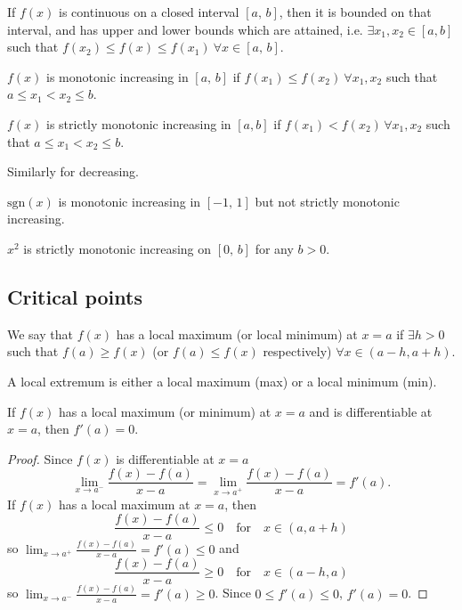 \documentclass[10pt, a4paper]{article}
\begin{document}
\begin{theorem}\label{calc_thm_extvalthm}
    If $f(x)$ is continuous on a closed interval $[a,\,b]$,
    then it is bounded on that interval,
    and has upper and lower bounds which are attained,
    i.e. $\exists x_1, x_2 \in [a, b]$ such that $f(x_2) \leq f(x) \leq f(x_1)\ \forall x \in [a,\,b]$.
\end{theorem}

\begin{definition}
    $f(x)$ is monotonic increasing in $[a,\,b]$ if
    $f(x_1) \leq f(x_2)\ \forall x_1, x_2$ such that
    $a \leq x_1 < x_2 \leq b$.
\end{definition}

\begin{definition}
    $f(x)$ is strictly monotonic increasing in $[a, b]$
    if $f(x_1) < f(x_2)\, \forall x_1, x_2$ such that
    $a \leq x_1 < x_2 \leq b$.
\end{definition}

Similarly for decreasing.

\begin{example}
    $\mathrm{sgn}(x)$ is monotonic increasing in $[-1,\,1]$
    but not strictly monotonic increasing.
\end{example}

\begin{example}
    $x ^ 2$ is strictly monotonic increasing on $[0,\,b]$ for any $b > 0$.
\end{example}

\subsection{Critical points}

\begin{definition}
    We say that $f(x)$ has a local maximum (or local minimum) at $x = a$ if $\exists h > 0$ such that $f(a) \geq f(x)$ (or $f(a) \leq f(x)$ respectively) $\forall x \in (a - h, a + h)$.
\end{definition}

A local extremum is either a local maximum (max) or a local minimum (min).

If $f(x)$ has a local maximum (or minimum) at $x = a$ and is differentiable at $x = a$,
then $f'(a) = 0$.
\begin{proof}
    Since $f(x)$ is differentiable at $x = a$
    \[
    \lim_{x \rightarrow a ^ {-}}\frac{f(x) - f(a)}{x - a} = 
    \lim_{x \rightarrow a ^ {+}}\frac{f(x) - f(a)}{x - a} =
    f'(a).
    \]
    If $f(x)$ has a local maximum at $x = a$,
    then
    \[
    \frac{f(x) - f(a)}{x - a} \leq 0\quad\text{for}\quad x \in (a, a + h)
    \]
    so $\displaystyle \lim_{x \rightarrow a^{+}}\frac{f(x) - f(a)}{x - a} = f'(a) \leq 0$
    and
    \[
    \frac{f(x) - f(a)}{x - a} \geq 0\quad\text{for}\quad x \in (a - h, a)
    \]
    so $\displaystyle \lim_{x \rightarrow a^{-}}\frac{f(x) - f(a)}{x - a} = f'(a) \geq 0$.
    Since $0 \leq f'(a) \leq 0$,
    $f'(a) = 0$.
\end{proof}
\end{document}

